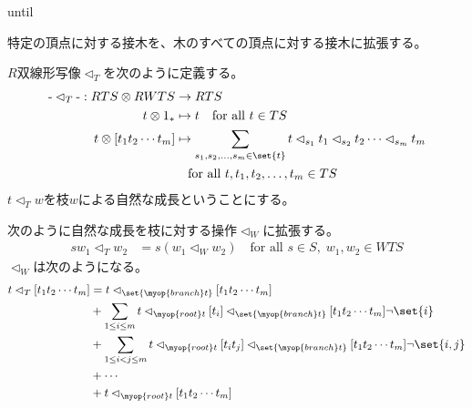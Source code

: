 until

	特定の頂点に対する接木を、木のすべての頂点に対する接木に拡張する。

	\begin{definition}[自然な成長]\label{def:自然な成長} %
		$R$双線形写像$\lhd_T$を次のように定義する。
		\begin{equation}\begin{split} %
			\mathchar`-\lhd_T\mathchar`- : RTS\otimes RWTS &\to RTS \\
				t\otimes 1_* &\mapsto t \quad\text{for all }t\in TS \\
				t\otimes [t_1t_2\cdots t_m] &\mapsto \sum_{s_1,s_2,\dots,s_m\in \set{t}}t \lhd_{s_1} t_1 \lhd_{s_2} t_2 \cdots \lhd_{s_m} t_m \\
				&\quad\text{for all }t,t_1,t_2,\dots,t_m\in TS \\
		\end{split}\end{equation} %
		$t\lhd_T w$を枝$w$による自然な成長ということにする。
	\end{definition} %

	次のように自然な成長を枝に対する操作$\lhd_W$に拡張する。
	\begin{equation}\begin{split} %
		sw_1\lhd_T w_2 &= s(w_1\lhd_W w_2) 
		\quad\text{for all }s\in S,\;w_1,w_2\in WTS
	\end{split}\end{equation} %
	$\lhd_W$は次のようになる。
	\begin{equation*}\begin{split} %
		t\lhd_T [t_1t_2\cdots t_m]
		&= t\lhd_{\set{\myop{branch}t}}[t_1t_2\cdots t_m] \\
		&+ \sum_{1\le i\le m}t\lhd_{\myop{root}t}[t_i]\lhd_{\set{\myop{branch}t}}[t_1t_2\cdots t_m]\neg\set{i} \\
		&+ \sum_{1\le i<j\le m}t\lhd_{\myop{root}t}[t_it_j]\lhd_{\set{\myop{branch}t}}[t_1t_2\cdots t_m]\neg\set{i,j} \\
		&+\cdots \\
		&+ t\lhd_{\myop{root}t}[t_1t_2\cdots t_m]
	\end{split}\end{equation*} %

